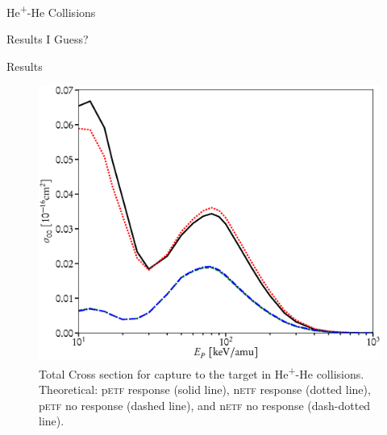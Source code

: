 \documentclass[letterpaper, 11 pt]{report}
\begin{document}
\begin{chapter}{\texorpdfstring{He\textsuperscript{+}}{He+}-He Collisions \label{chap:hephe}}
\begin{section}{Results I Guess? \label{sec:hephe-disc}}
\begin{subsection}{Results \label{sec:hephe-res}}
\begin{figure}[t]
\begin{minipage}{.49\linewidth}
               \centering
               \includegraphics[width = \linewidth]{./images/hephe-cross/HepHe-300.eps}
               \caption[Total Cross section for capture to the target in He\textsuperscript{+}-He
                        collisions.]
                       {Total Cross section for capture to the target in He\textsuperscript{+}-He
                        collisions.
                        Theoretical: p\textsc{etf} response (solid line), n\textsc{etf} response (dotted
                                  line),
                                  p\textsc{etf} no response (dashed line), and n\textsc{etf} no response
                                  (dash-dotted line). \label{fig:cs300}}
            \end{minipage} \hspace{0.04\linewidth} %
            \begin{minipage}{.49\linewidth}
               

\end{minipage}
\end{figure}
\end{subsection}
\end{section}
\end{chapter}
\end{document}
